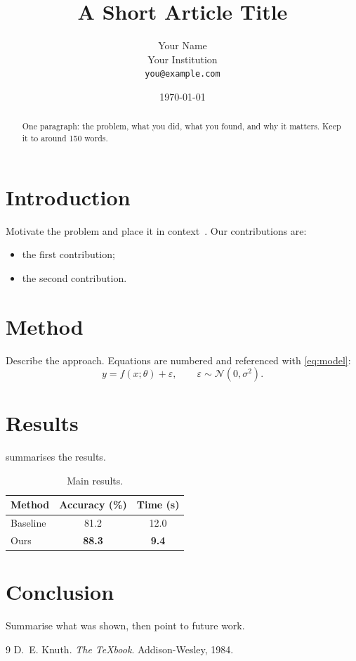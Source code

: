 \documentclass[11pt, a4paper]{article}
\title{A Short Article Title}
\author{Your Name\\[2pt]
  \small Your Institution\\
  \small\texttt{you@example.com}}
\date{\today}
\begin{document}
\maketitle

\begin{abstract}
  One paragraph: the problem, what you did, what you found, and why it
  matters. Keep it to around 150 words.
\end{abstract}

\section{Introduction}\label{sec:intro}
Motivate the problem and place it in context~\cite{knuth1984}.
Our contributions are:
\begin{itemize}
  \item the first contribution;
  \item the second contribution.
\end{itemize}

\section{Method}\label{sec:method}
Describe the approach. Equations are numbered and referenced with
\cref{eq:model}:
\begin{equation}\label{eq:model}
  y = f(x; \theta) + \varepsilon, \qquad \varepsilon \sim \mathcal{N}(0, \sigma^2).
\end{equation}

\section{Results}\label{sec:results}
 summarises the results.
\begin{table}[htbp]
  \centering
  \caption{Main results.}
  \label{tab:results}
  \begin{tabular}{@{}lcc@{}}
    \toprule
    Method   & Accuracy (\%) & Time (s) \\
    \midrule
    Baseline & 81.2          & 12.0 \\
    Ours     & \textbf{88.3} & \textbf{9.4} \\
    \bottomrule
  \end{tabular}
\end{table}

\section{Conclusion}\label{sec:conclusion}
Summarise what was shown, then point to future work.

\begin{thebibliography}{9}
   D.~E. Knuth. \emph{The \TeX book}. Addison-Wesley, 1984.
\end{thebibliography}
\end{document}

